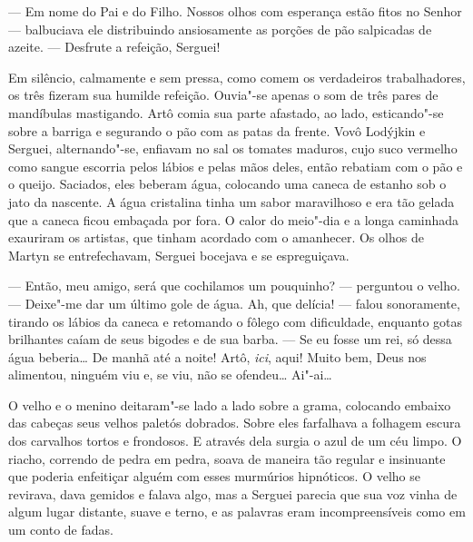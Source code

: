 --- Em nome do Pai e do Filho. Nossos olhos com esperança estão fitos no
Senhor --- balbuciava ele distribuindo ansiosamente as porções de pão
salpicadas de azeite. --- Desfrute a refeição, Serguei!


Em silêncio, calmamente e sem pressa, como comem os verdadeiros
trabalhadores, os três fizeram sua humilde refeição. Ouvia"-se apenas o
som de três pares de mandíbulas mastigando. Artô comia sua parte
afastado, ao lado, esticando"-se sobre a barriga e segurando o pão com as
patas da frente. Vovô Lodýjkin e Serguei, alternando"-se, enfiavam no sal
os tomates maduros, cujo suco vermelho como sangue escorria pelos lábios
e pelas mãos deles, então rebatiam com o pão e o queijo. Saciados, eles
beberam água, colocando uma caneca de estanho sob o jato da nascente. A
água cristalina tinha um sabor maravilhoso e era tão gelada que a
caneca ficou embaçada por fora. O calor do meio"-dia e a longa caminhada
exauriram os artistas, que tinham acordado com o amanhecer. Os olhos de
Martyn se entrefechavam, Serguei bocejava e se espreguiçava.

--- Então, meu amigo, será que cochilamos um pouquinho? --- perguntou o
velho. --- Deixe"-me dar um último gole de água. Ah, que delícia! ---
falou sonoramente, tirando os lábios da caneca e retomando o fôlego com
dificuldade, enquanto gotas brilhantes caíam de seus bigodes e de sua
barba. --- Se eu fosse um rei, só dessa água beberia\ldots{} De manhã até a
noite! Artô, \emph{ici}, aqui! Muito bem, Deus nos alimentou, ninguém
viu e, se viu, não se ofendeu\ldots{} Ai"-ai\ldots{}

O velho e o menino deitaram"-se lado a lado sobre a grama, colocando embaixo
das cabeças seus velhos paletós dobrados. Sobre eles farfalhava a
folhagem escura dos carvalhos tortos e frondosos. E através dela surgia
o azul de um céu limpo. O riacho, correndo de pedra em pedra, soava de
maneira tão regular e insinuante que poderia enfeitiçar alguém com
esses murmúrios hipnóticos. O velho se revirava, dava gemidos e falava
algo, mas a Serguei parecia que sua voz vinha de algum lugar distante,
suave e terno, e as palavras eram incompreensíveis como em um conto de
fadas.


